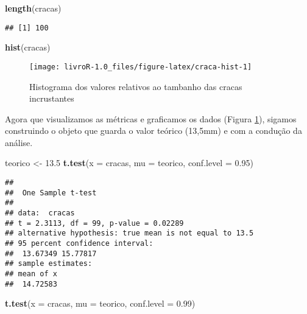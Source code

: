 \documentclass[14pt,titlepage, oneside, openany, a4paper]{book}
\newenvironment{Shaded}{\begin{snugshade}}{\end{snugshade}}
\newcommand{\DataTypeTok}[1]{\textcolor[rgb]{0.13,0.29,0.53}{#1}}
\newcommand{\FloatTok}[1]{\textcolor[rgb]{0.00,0.00,0.81}{#1}}
\newcommand{\KeywordTok}[1]{\textcolor[rgb]{0.13,0.29,0.53}{\textbf{#1}}}
\newcommand{\NormalTok}[1]{#1}
\newcommand{\StringTok}[1]{\textcolor[rgb]{0.31,0.60,0.02}{#1}}
\begin{document}
\begin{Shaded}
\begin{Highlighting}[]
\KeywordTok{length}\NormalTok{(cracas)}
\end{Highlighting}
\end{Shaded}

\begin{verbatim}
## [1] 100
\end{verbatim}

\begin{Shaded}
\begin{Highlighting}[]
\KeywordTok{hist}\NormalTok{(cracas)}
\end{Highlighting}
\end{Shaded}

\begin{figure}[H]

{\centering \texttt{[image: livroR-1.0\_files/figure-latex/craca-hist-1]} 

}

\caption{Histograma dos valores relativos ao tambanho das cracas incrustantes}\label{fig:craca-hist}
\end{figure}

Agora que visualizamos as métricas e graficamos os dados (Figura \ref{fig:craca-hist}), sigamos construindo o objeto que guarda o valor teórico (13,5mm) e com a condução da análise.

\begin{Shaded}
\begin{Highlighting}[]
\NormalTok{teorico <-}\StringTok{ }\FloatTok{13.5}
\KeywordTok{t.test}\NormalTok{(}\DataTypeTok{x =}\NormalTok{ cracas, }\DataTypeTok{mu =}\NormalTok{ teorico, }\DataTypeTok{conf.level =} \FloatTok{0.95}\NormalTok{)}
\end{Highlighting}
\end{Shaded}

\begin{verbatim}
## 
##  One Sample t-test
## 
## data:  cracas
## t = 2.3113, df = 99, p-value = 0.02289
## alternative hypothesis: true mean is not equal to 13.5
## 95 percent confidence interval:
##  13.67349 15.77817
## sample estimates:
## mean of x 
##  14.72583
\end{verbatim}

\begin{Shaded}
\begin{Highlighting}[]
\KeywordTok{t.test}\NormalTok{(}\DataTypeTok{x =}\NormalTok{ cracas, }\DataTypeTok{mu =}\NormalTok{ teorico, }\DataTypeTok{conf.level =} \FloatTok{0.99}\NormalTok{)}
\end{Highlighting}
\end{Shaded}
\end{document}
